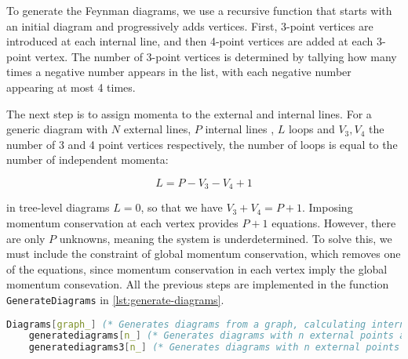 \documentclass[main.tex]{subfiles}
\begin{document}
To generate the Feynman diagrams, we use a recursive function that starts with an initial diagram and progressively adds vertices. 
First, 3-point vertices are introduced at each internal line, and then 4-point vertices are added at each 3-point vertex. 
The number of 3-point vertices is determined by tallying how many times a negative number appears in the list, with each negative number 
appearing at most 4 times.

The next step is to assign momenta to the external and internal lines.
For a generic diagram with $N$ external lines, $P$ internal lines , $L$ loops and $V_3,V_4$ the number of 3 and 4 point vertices respectively,
the number of loops is equal to the number of independent momenta:

\begin{equation}
    L = P - V_3 -V_4 + 1
\end{equation}

in tree-level diagrams $L=0$, so that we have $V_3 + V_4 = P + 1 $. Imposing momentum conservation at each vertex provides $P+1$ equations.
However, there are only $P$ unknowns, meaning the system is underdetermined. To solve this, we must include the constraint of global momentum conservation, 
which removes one of the equations, since  momentum conservation in each vertex imply the global momentum consevation.
All the previous steps are implemented in the function \texttt{GenerateDiagrams} in \cref{lst:generate-diagrams}.


\begin{lstlisting}[language=Mathematica,caption = {Generating Feynman diagrams}, label = {lst:generate-diagrams}]
    Diagrams[graph_] (* Generates diagrams from a graph, calculating internal momenta and Lorentz and color indices for the vertices and propagators *)
    generatediagrams[n_] (* Generates diagrams with n external points and only 3 and 4-point vertices *)
    generatediagrams3[n_] (* Generates diagrams with n external points and only 3-point vertices *)
\end{lstlisting}
\end{document}
